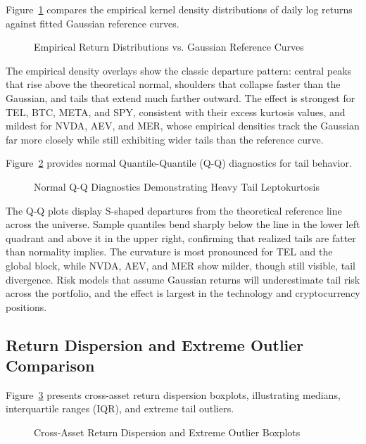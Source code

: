 Figure~\ref{fig:density_hist} compares the empirical kernel density distributions of daily log returns against fitted Gaussian reference curves.

\begin{figure}[H]
  \centering
  \caption{Empirical Return Distributions vs. Gaussian Reference Curves}
  \label{fig:density_hist}
\end{figure}

The empirical density overlays show the classic departure pattern: central peaks that rise above the theoretical normal, shoulders that collapse faster than the Gaussian, and tails that extend much farther outward. The effect is strongest for TEL, BTC, META, and SPY, consistent with their excess kurtosis values, and mildest for NVDA, AEV, and MER, whose empirical densities track the Gaussian far more closely while still exhibiting wider tails than the reference curve.

Figure~\ref{fig:qq_plots} provides normal Quantile-Quantile (Q-Q) diagnostics for tail behavior.

\begin{figure}[H]
  \centering
  \caption{Normal Q-Q Diagnostics Demonstrating Heavy Tail Leptokurtosis}
  \label{fig:qq_plots}
\end{figure}

The Q-Q plots display S-shaped departures from the theoretical reference line across the universe. Sample quantiles bend sharply below the line in the lower left quadrant and above it in the upper right, confirming that realized tails are fatter than normality implies. The curvature is most pronounced for TEL and the global block, while NVDA, AEV, and MER show milder, though still visible, tail divergence. Risk models that assume Gaussian returns will underestimate tail risk across the portfolio, and the effect is largest in the technology and cryptocurrency positions.

\subsection{Return Dispersion and Extreme Outlier Comparison}

Figure~\ref{fig:boxplots} presents cross-asset return dispersion boxplots, illustrating medians, interquartile ranges (IQR), and extreme tail outliers.

\begin{figure}[H]
  \centering
  \caption{Cross-Asset Return Dispersion and Extreme Outlier Boxplots}
  \label{fig:boxplots}
\end{figure}

